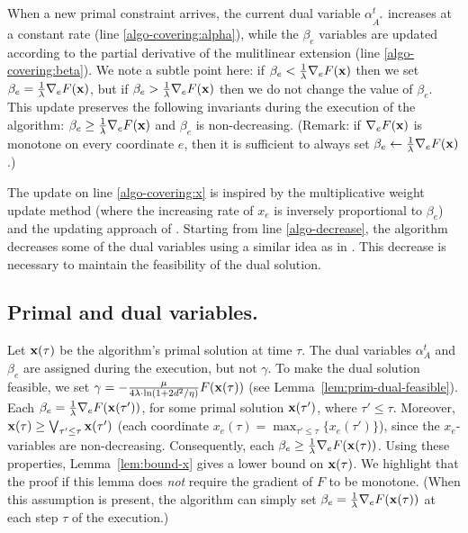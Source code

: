 When a new primal constraint arrives, the current dual variable $\alpha^{t}_{A^*}$ increases at a constant rate (line \ref{algo-covering:alpha}), while the $\beta_e$ variables are updated according to the partial derivative of the mulitlinear extension (line \ref{algo-covering:beta}). We note a subtle point here: if $\beta_e < \frac{1}{\lambda} \nabla_{e} F(\mathbf{x})$ then we set
$\beta_e = \frac{1}{\lambda} \nabla_{e} F(\mathbf{x})$, but if $\beta_e > \frac{1}{\lambda} \nabla_{e} F(\mathbf{x})$ then we do not change the value of $\beta_e$. This update preserves the following invariants during the execution of the algorithm: $\beta_{e} \geq \frac{1}{\lambda} \nabla_{e} F(\mathbf{x})$ and $\beta_{e}$ is non-decreasing. (Remark: if $\nabla_{e} F(\mathbf{x})$ is monotone on every coordinate $e$, then it is sufficient to always set $\beta_{e} \gets \frac{1}{\lambda} \nabla_{e} F(\mathbf{x})$.)

The update on line \ref{algo-covering:x} is inspired by the multiplicative weight update method (where the increasing rate of $x_{e}$
is inversely proportional to $\beta_{e}$) and the updating approach of \cite{BamasMaggiori20:The-Primal-Dual-method}.
Starting from line \ref{algo-decrease}, the algorithm decreases some of the dual variables using a similar idea as in
\cite{AzarBuchbinder16:Online-Algorithms}. This decrease is necessary to maintain the feasibility of the dual solution.


\subsection{Primal and dual variables.}
Let $\mathbf{x}(\tau)$ be the algorithm's primal solution at time $\tau$. The dual variables $\alpha^{t}_{A}$ and $\beta_{e}$ are assigned during the execution, but not $\gamma$. To make the dual solution feasible, we set $\gamma = -\frac{\mu}{4\lambda \cdot \ln(1+2d^{2}/\eta)} F(\mathbf{x}(\tau))$ (see Lemma~\ref{lem:prim-dual-feasible}). Each $\beta_{e} = \frac{1}{\lambda} \nabla_{e} F(\mathbf{x}(\tau'))$, for some primal solution $\mathbf{x}(\tau')$, where $\tau' \le \tau$. Moreover, $\mathbf{x}(\tau) \geq \bigvee_{\tau' \le \tau} \mathbf{x}(\tau')$ (each coordinate $x_{e}(\tau) = \max_{\tau' \le \tau}\{x_{e}(\tau')\}$), since the $x_e$-variables are non-decreasing. Consequently, each $\beta_{e} \geq \frac{1}{\lambda} \nabla_{e} F(\mathbf{x}(\tau))$. Using these properties, Lemma~\ref{lem:bound-x} gives a lower bound on $\mathbf{x}(\tau)$. We highlight that the proof if this lemma does \emph{not} require the gradient of $F$ to be monotone.
(When this assumption is present, the algorithm can simply set $\beta_{e} = \frac{1}{\lambda} \nabla_{e} F(\mathbf{x}(\tau))$ at each step $\tau$ of the execution.)


